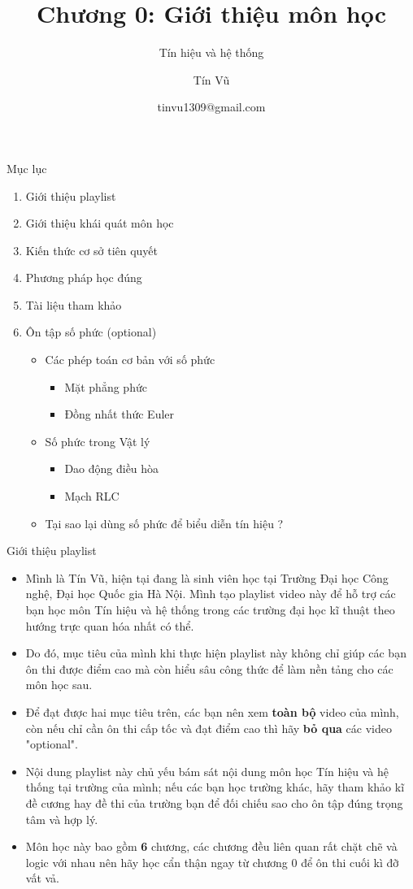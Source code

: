 \documentclass[8pt]{beamer}
\title[Chương 0: Giới thiệu môn học] %
{Chương 0: Giới thiệu môn học}
\subtitle{Tín hiệu và hệ thống}
\author[Tín hiệu và hệ thống] %
{Tín Vũ}
\date[VLC 2021] %
{tinvu1309@gmail.com}
\begin{document}
\frame{\titlepage}
\begin{frame}{Mục lục}
\tableofcontents
	\begin{enumerate}
		\item Giới thiệu playlist
		\item Giới thiệu khái quát môn học
		\item Kiến thức cơ sở tiên quyết
		\item Phương pháp học đúng
		\item Tài liệu tham khảo
		\item Ôn tập số phức (optional)
			\begin{itemize}
				\item Các phép toán cơ bản với số phức 
					\begin{itemize}
						\item Mặt phẳng phức
						\item Đồng nhất thức Euler
					\end{itemize}
				\item Số phức trong Vật lý
					\begin{itemize}
						\item Dao động điều hòa
						\item Mạch RLC
					\end{itemize}
				\item Tại sao lại dùng số phức để biểu diễn tín hiệu ?
			\end{itemize}
	\end{enumerate}
\end{frame}
\begin{frame}{Giới thiệu playlist}
	\begin{itemize}
		\item Mình là Tín Vũ, hiện tại đang là sinh viên học tại Trường Đại học Công nghệ, Đại học Quốc gia Hà Nội. Mình tạo playlist video này để hỗ trợ các bạn học môn Tín hiệu và hệ thống trong các trường đại học kĩ thuật theo hướng \alert{trực quan hóa} nhất có thể.
		\item Do đó, mục tiêu của mình khi thực hiện playlist này không chỉ giúp các bạn ôn thi được điểm cao mà còn \alert{hiểu sâu công thức để làm nền tảng cho các môn học sau}.
		\item Để đạt được hai mục tiêu trên, các bạn nên xem \textbf{toàn bộ} video của mình, còn nếu chỉ cần ôn thi cấp tốc và đạt điểm cao thì hãy \textbf{bỏ qua} các video "optional".
		\item Nội dung playlist này chủ yếu bám sát nội dung môn học Tín hiệu và hệ thống tại trường của mình; nếu các bạn học trường khác, hãy tham khảo kĩ đề cương hay đề thi của trường bạn để đối chiếu sao cho ôn tập đúng trọng tâm và hợp lý. 
		\item Môn học này bao gồm \textbf{6} chương, các chương đều liên quan rất chặt chẽ và logic với nhau nên hãy học cẩn thận ngay từ \alert{chương 0} để ôn thi cuối kì đỡ vất vả.
	\end{itemize}
\end{frame}
\end{document}
